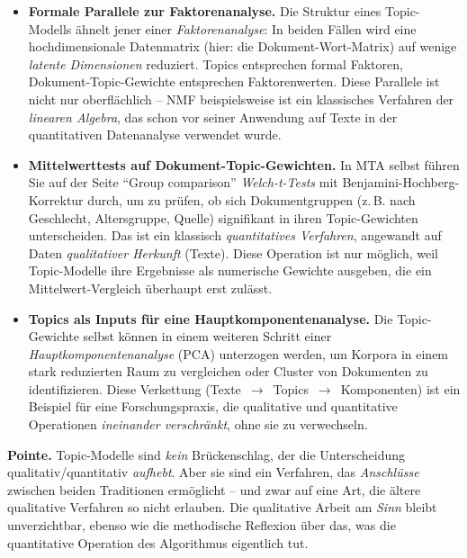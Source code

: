 \documentclass[a4paper,11pt]{article}
\begin{document}
\begin{itemize}
\item \textbf{Formale Parallele zur Faktorenanalyse.} Die Struktur
eines Topic-Modells ähnelt jener einer \emph{Faktorenanalyse}: In
beiden Fällen wird eine hochdimensionale Datenmatrix (hier: die
Dokument-Wort-Matrix) auf wenige \emph{latente Dimensionen}
reduziert. Topics entsprechen formal Faktoren, Dokument-Topic-Gewichte
entsprechen Faktorenwerten. Diese Parallele ist nicht nur
oberflächlich -- NMF beispielsweise ist ein klassisches
Verfahren der \emph{linearen Algebra}, das schon vor seiner
Anwendung auf Texte in der quantitativen Datenanalyse verwendet
wurde.

\item \textbf{Mittelwerttests auf Dokument-Topic-Gewichten.} In MTA
selbst führen Sie auf der Seite \enquote{Group comparison}
\emph{Welch-t-Tests} mit Benjamini-Hochberg-Korrektur durch, um zu
prüfen, ob sich Dokumentgruppen (z.\,B. nach Geschlecht, Altersgruppe,
Quelle) signifikant in ihren Topic-Gewichten unterscheiden. Das ist
ein klassisch \emph{quantitatives Verfahren}, angewandt auf Daten
\emph{qualitativer Herkunft} (Texte). Diese Operation ist nur
möglich, weil Topic-Modelle ihre Ergebnisse als numerische Gewichte
ausgeben, die ein Mittelwert-Vergleich überhaupt erst zulässt.

\item \textbf{Topics als Inputs für eine Hauptkomponentenanalyse.}
Die Topic-Gewichte selbst können in einem weiteren Schritt einer
\emph{Hauptkomponentenanalyse} (PCA) unterzogen werden, um Korpora
in einem stark reduzierten Raum zu vergleichen oder Cluster von
Dokumenten zu identifizieren. Diese Verkettung
(Texte~$\to$~Topics~$\to$~Komponenten) ist ein Beispiel für eine
Forschungspraxis, die qualitative und quantitative Operationen
\emph{ineinander verschränkt}, ohne sie zu verwechseln.
\end{itemize}

\begin{merkbox}
\textbf{Pointe.} Topic-Modelle sind \emph{kein} Brückenschlag, der
die Unterscheidung qualitativ/quantitativ \emph{aufhebt}. Aber sie
sind ein Verfahren, das \emph{Anschlüsse} zwischen beiden Traditionen
ermöglicht -- und zwar auf eine Art, die ältere qualitative Verfahren
so nicht erlauben. Die qualitative Arbeit am \emph{Sinn} bleibt
unverzichtbar, ebenso wie die methodische Reflexion über das, was die
quantitative Operation des Algorithmus eigentlich tut.
\end{merkbox}
\end{document}
